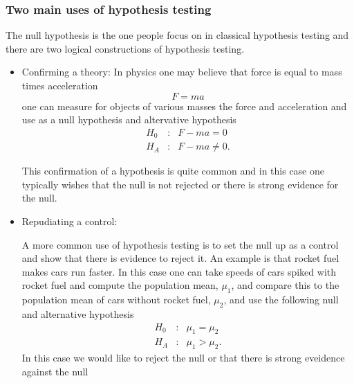 \begin{frame}[fragile]\frametitle{Two main uses of hypothesis testing}

{\tiny

The null hypothesis is the one people focus on in classical
hypothesis testing and there are two logical constructions
of hypothesis testing.

\begin{itemize}

\item Confirming a theory: In physics one may believe
that force is equal to mass times acceleration
$$F=ma$$
one can measure for objects of various masses
the force and acceleration and use as a null
hypothesis and altervative hypothesis
\begin{eqnarray*}
H_0&:& F-ma = 0 \\
H_A&:& F-ma \neq 0.
\end{eqnarray*}

This confirmation of a hypothesis is quite common and
in this case one typically wishes that the null is not
rejected or there is strong evidence for the null.

\item Repudiating a control:

A more common use of hypothesis testing is to set the null
up as a control and show that there is evidence to reject it.
An example is that rocket fuel makes cars run faster. In
this case one can take speeds of cars spiked with rocket fuel
and compute the population mean, $\mu_1$, and compare this
to the population mean of cars without rocket fuel, $\mu_2$,
and use the following null and alternative hypothesis
\begin{eqnarray*}
H_0&:& \mu_1 = \mu_2 \\
H_A&:& \mu_1 > \mu_2.
\end{eqnarray*}
In this case we would like to reject the null or that there
is strong eveidence against the null

\end{itemize}

}

\end{frame}


